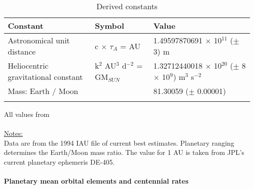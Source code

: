 \documentclass[Orbiter User Manual.tex]{subfiles}
\begin{document}
	\begin{longtable}{ |p{}|p{}|p{}| }
	\hline\rule{0pt}{2ex}
	\textbf{Constant} & \textbf{Symbol} & \textbf{Value}\\
	\hline\rule{0pt}{2ex}
	Astronomical unit distance & c $\times$ $\tau_{A}$ = AU & 1.49597870691 $\times$ 10$^{11}$ ($\pm$ 3) m\\
	\hline\rule{0pt}{2ex}
	Heliocentric gravitational constant & k$^{2}$ AU$^{3}$ d$^{-2}$ = GM$_{SUN}$ & 1.32712440018 $\times$ 10$^{20}$ ($\pm$ 8 $\times$ 10$^{9}$) m$^{3}$ s$^{-2}$\\
	\hline\rule{0pt}{2ex}
	Mass: Earth / Moon & & 81.30059 ($\pm$ 0.00001)\\
	\hline
	\caption{Derived constants}
	\end{longtable}

\noindent
All values from \cite{standish1995}\\
\\
\underline{Notes:}\\
Data are from the 1994 IAU file of current best estimates. Planetary ranging determines the Earth/Moon mass ratio. The value for 1 AU is taken from JPL’s current planetary ephemeris DE-405.\\
\\
\textbf{Planetary mean orbital elements and centennial rates}
\end{document}
